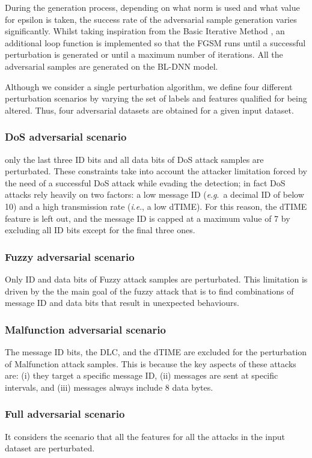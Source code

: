 \documentclass[conference]{IEEEtran}
\newcommand{\ie}{\textit{i}.\textit{e}., }
\newcommand{\eg}{\textit{e}.\textit{g}.\ }
\begin{document}
During the generation process, depending on what norm is used and what value for epsilon is taken, the success rate of the adversarial sample generation varies significantly. Whilst taking inspiration from the Basic Iterative Method \cite{Basic_Iterative_Method}, an additional loop function is implemented so that the FGSM runs until a successful perturbation is generated or until a maximum number of iterations. All the adversarial samples are generated on the BL-DNN model.

Although we consider a single perturbation algorithm, we define four different perturbation scenarios by varying the set of labels and features qualified for being altered. Thus, four adversarial datasets are obtained for a given input dataset.

\subsubsection{DoS adversarial scenario} only the last three ID bits and all data bits of DoS attack samples are perturbated. These constraints take into account the attacker limitation forced by the need of a successful DoS attack while evading the detection; in fact DoS attacks rely heavily on two factors: a low message ID (\eg a decimal ID of below 10) and a high transmission rate (\ie a low dTIME). For this reason, the dTIME feature is left out, and the message ID is capped at a maximum value of 7 by excluding all ID bits except for the final three ones.
\subsubsection{Fuzzy adversarial scenario} Only ID and data bits of Fuzzy attack samples are perturbated. This limitation is driven by the the main goal of the fuzzy attack that is to find combinations of message ID and data bits that result in unexpected behaviours.
\subsubsection{Malfunction adversarial scenario} The message ID bits, the DLC, and the dTIME are excluded for the perturbation of Malfunction attack samples. This is because the key aspects of these attacks are: (i) they target a specific message ID, (ii) messages are sent at specific intervals, and (iii) messages always include 8 data bytes.
\subsubsection{Full adversarial scenario} It considers the scenario that all the features for all the attacks in the input dataset are perturbated.
\end{document}

